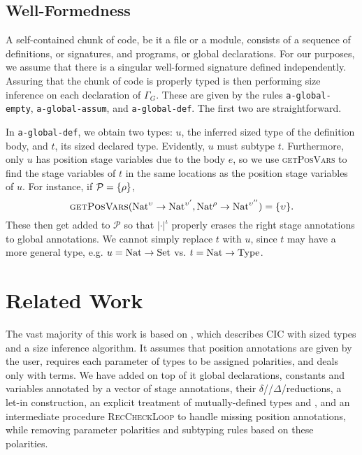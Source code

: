 \documentclass[sigplan,10pt,anonymous,review,nonacm]{acmart}
\begin{document}
\subsection{Well-Formedness}

A self-contained chunk of code, be it a file or a module, consists of a sequence of \coinductive definitions, or signatures, and programs, or global declarations. For our purposes, we assume that there is a singular well-formed signature defined independently. Assuring that the chunk of code is properly typed is then performing size inference on each declaration of $\Gamma_G$. These are given by the rules \texttt{a-global-empty}, \texttt{a-global-assum}, and \texttt{a-global-def}. The first two are straightforward.

In \texttt{a-global-def}, we obtain two types: $u$, the inferred sized type of the definition body, and $t$, its sized declared type. Evidently, $u$ must subtype $t$. Furthermore, only $u$ has position stage variables due to the body $e$, so we use \textsc{getPosVars} to find the stage variables of $t$ in the same locations as the position stage variables of $u$. For instance, if $\mathcal{P} = \{\rho\}$, $$\textsc{getPosVars}(\text{Nat}^\upsilon \to \text{Nat}^{\upsilon'}, \text{Nat}^\rho \to \text{Nat}^{\upsilon''}) = \{\upsilon\}.$$ These then get added to $\mathcal{P}$ so that $|\cdot|^\iota$ properly erases the right stage annotations to global annotations. We cannot simply replace $t$ with $u$, since $t$ may have a more general type, e.g. $u = \text{Nat} \to \text{Set}$ vs. $t = \text{Nat} \to \text{Type}_{}$.

\section{Related Work}\label{related}

The vast majority of this work is based on \CIChat \cite{cic-hat}, which describes CIC with sized types and a size inference algorithm. It assumes that position annotations are given by the user, requires each parameter of \coinductive types to be assigned polarities, and deals only with terms. We have added on top of it global declarations, constants and variables annotated by a vector of stage annotations, their $\delta$\-//$\Delta$\-/reductions, a let-in construction, an explicit treatment of mutually-defined \coinductive types and \cofixpoints, and an intermediate procedure \textsc{RecCheckLoop} to handle missing position annotations, while removing parameter polarities and subtyping rules based on these polarities.
\end{document}
